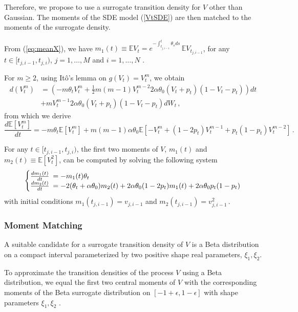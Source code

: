 \documentclass[11pt]{article}
\theoremstyle{definition}
\begin{document}
Therefore, we propose to use a surrogate transition density for $V$ other than Gaussian. The moments of the SDE model (\ref{VtSDE}) are then matched to the moments of the surrogate density. 

From (\ref{eq:meanX}), we have $m_1(t) \equiv \mathbb{E} V_t = e^{- \int_{t_{j,i-1}}^t \theta_s ds} \,\mathbb{E} V_{t_{j,i-1}}$, for any $t\in [t_{j,i-1}, t_{j, i})$, $j = 1, \ldots, M$ and $i = 1, \ldots, N$ .

For $m \geq 2$, using It\^o's lemma on $g(V_t) = V_t^m$, we obtain
\begin{align}
d(V_t^m) & = \left( - m \theta_t V_t^m + \frac{1}{2} m (m -1) V_t^{m -2} 2 \alpha \theta_0 (V_t + p_t) (1 - V_t - p_t) \right) dt  \nonumber \\
& + m V_t^{m-1} 2 \alpha \theta_0 (V_t + p_t) (1 - V_t - p_t) dW_t \,, \nonumber
\end{align}
from which we derive
\begin{equation}
\frac{d \mathbb{E}[ V^m_t]}{dt} = - m \theta_t \mathbb{E}[ V^m_t] + m (m-1) \alpha \theta_0  \mathbb{E}[ - V_t^m + (1 - 2 p_t) V_t^{m-1} + p_t (1 -p_t) V_t^{m-2} ] \,.
\end{equation}

For any $t\in [t_{j,i-1}, t_{j, i})$, the first two moments of $V$, $m_1(t)$ and $m_2(t) \equiv \mathbb{E}[V_t^2]$, can be computed by solving the following system
\begin{equation}
  \left\{
  \begin{array}{@{}rl@{}}
    \frac{d m_1 (t)}{dt} \!\!\!&=  - m_1(t)\theta_t   \\
   \frac{d m_2 (t)}{dt}  \!\!\!&=  -2 (\theta_t +\alpha \theta_0) m_2(t) + 2 \alpha\theta_0 (1-2p_t)  m_1(t) + 2 \alpha\theta_0 p_t (1-p_t) 
 \end{array}\right.  \label{Vtmom}
\end{equation}
with initial conditions $m_1(t_{j,i-1})= v_{j, i-1}$ and $m_2(t_{j,i-1})= v_{j, i-1}^2 \,.$


\subsubsection*{ Moment Matching}
A suitable candidate for a surrogate transition density of $V$ is a Beta distribution on a compact interval parameterized by two positive shape real parameters, $\xi_1, \xi_2$. 

To approximate the transition densities of  the process $V$ using a Beta distribution, we equal the first two central moments of $V$ with the corresponding moments of the Beta surrogate distribution on $[-1 + \epsilon,1 - \epsilon]$ with shape parameters $\xi_1, \xi_2$ . 
\end{document}
